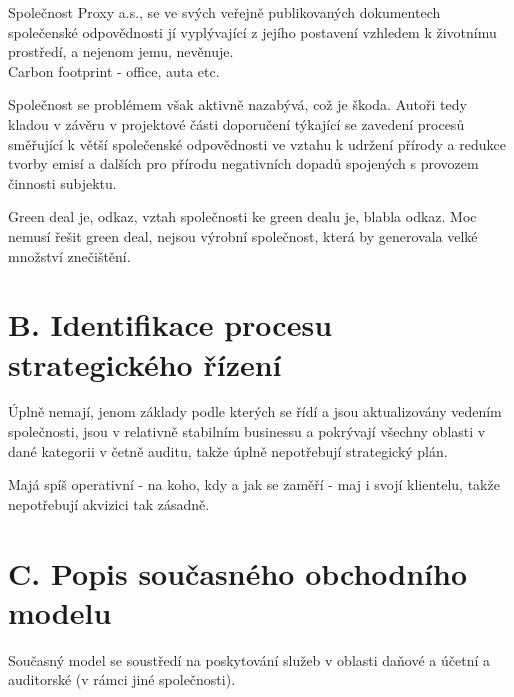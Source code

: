 Společnost Proxy a.s., se ve svých veřejně publikovaných dokumentech společenské odpovědnosti jí vyplývající z jejího postavení vzhledem k životnímu prostředí, a nejenom jemu, nevěnuje.\\

Carbon footprint - office, auta etc.

Společnost se problémem však aktivně nazabývá, což je škoda. Autoři tedy kladou v závěru v projektové části doporučení týkající se zavedení procesů směřující k větší společenské odpovědnosti ve vztahu k udržení přírody a redukce tvorby emisí a dalších pro přírodu negativních dopadů spojených s provozem činnosti subjektu.

Green deal je, odkaz, vztah společnosti ke green dealu je, blabla odkaz. Moc nemusí řešit green deal, nejsou výrobní společnost, která by generovala velké množství znečištění.

\section*{B. Identifikace procesu strategického řízení}
\label{sec:Identifikace procesu strategickeho rizeni}

Úplně nemají, jenom základy podle kterých se řídí a jsou aktualizovány vedením společnosti, jsou v relativně stabilním businessu a pokrývají všechny oblasti v dané kategorii v četně auditu, takže úplně nepotřebují strategický plán.

Majá spíš operativní - na koho, kdy a jak se zaměří - maj i svojí klientelu, takže nepotřebují akvizici tak zásadně.

\section*{C. Popis současného obchodního modelu}
\label{sec:Popis soucasneho obchodniho modelu}

Současný model se soustředí na poskytování služeb v oblasti daňové a účetní a auditorské (v rámci jiné společnosti).

\newpage



